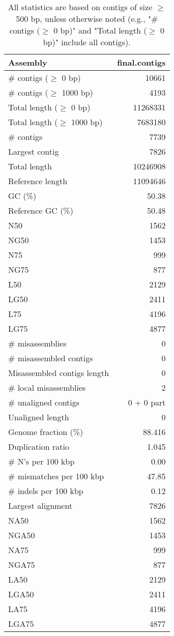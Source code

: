 \documentclass[12pt,a4paper]{article}
\begin{document}
\begin{table}[ht]
\begin{center}
\caption{All statistics are based on contigs of size $\geq$ 500 bp, unless otherwise noted (e.g., "\# contigs ($\geq$ 0 bp)" and "Total length ($\geq$ 0 bp)" include all contigs).}
\begin{tabular}{|l*{1}{|r}|}
\hline
Assembly & final.contigs \\ \hline
\# contigs ($\geq$ 0 bp) & 10661 \\ \hline
\# contigs ($\geq$ 1000 bp) & 4193 \\ \hline
Total length ($\geq$ 0 bp) & 11268331 \\ \hline
Total length ($\geq$ 1000 bp) & 7683180 \\ \hline
\# contigs & 7739 \\ \hline
Largest contig & 7826 \\ \hline
Total length & 10246908 \\ \hline
Reference length & 11094646 \\ \hline
GC (\%) & 50.38 \\ \hline
Reference GC (\%) & 50.48 \\ \hline
N50 & 1562 \\ \hline
NG50 & 1453 \\ \hline
N75 & 999 \\ \hline
NG75 & 877 \\ \hline
L50 & 2129 \\ \hline
LG50 & 2411 \\ \hline
L75 & 4196 \\ \hline
LG75 & 4877 \\ \hline
\# misassemblies & 0 \\ \hline
\# misassembled contigs & 0 \\ \hline
Misassembled contigs length & 0 \\ \hline
\# local misassemblies & 2 \\ \hline
\# unaligned contigs & 0 + 0 part \\ \hline
Unaligned length & 0 \\ \hline
Genome fraction (\%) & 88.416 \\ \hline
Duplication ratio & 1.045 \\ \hline
\# N's per 100 kbp & 0.00 \\ \hline
\# mismatches per 100 kbp & 47.85 \\ \hline
\# indels per 100 kbp & 0.12 \\ \hline
Largest alignment & 7826 \\ \hline
NA50 & 1562 \\ \hline
NGA50 & 1453 \\ \hline
NA75 & 999 \\ \hline
NGA75 & 877 \\ \hline
LA50 & 2129 \\ \hline
LGA50 & 2411 \\ \hline
LA75 & 4196 \\ \hline
LGA75 & 4877 \\ \hline
\end{tabular}
\end{center}
\end{table}
\end{document}
